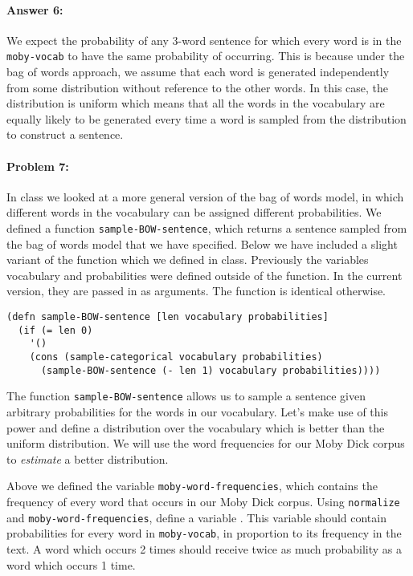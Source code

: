 \documentclass[10pt]{article}
\newcommand{\required}[1]{{\color{blue}{#1}}}
\begin{document}
\paragraph{Answer 6:} We expect the probability of any 3-word sentence for which every word is in the \verb|moby-vocab| to have the same probability of occurring. This is because under the bag of words approach, we assume that each word is generated independently from some distribution without reference to the other words. In this case, the distribution is uniform which means that all the words in the vocabulary are equally likely to be generated every time a word is sampled from the distribution to construct a sentence.

\noindent\hrulefill %

\paragraph{Problem 7:}

In class we looked at a more general version of the bag of words
model, in which different words in the vocabulary can be assigned
different probabilities. We defined a function \texttt{sample-BOW-sentence},
which returns a sentence sampled from the bag of words model that we
have specified. Below we have included a slight variant of the
function which we defined in class. Previously the variables
vocabulary and probabilities were defined outside of the function. In
the current version, they are passed in as arguments. The function is
identical otherwise.

\begin{lstlisting}
(defn sample-BOW-sentence [len vocabulary probabilities]
  (if (= len 0)
    '()
    (cons (sample-categorical vocabulary probabilities)
	  (sample-BOW-sentence (- len 1) vocabulary probabilities))))
\end{lstlisting}

The function \texttt{sample-BOW-sentence} allows us to sample a
sentence given arbitrary probabilities for the words in our
vocabulary. Let's make use of this power and define a distribution
over the vocabulary which is better than the uniform distribution. We
will use the word frequencies for our Moby Dick corpus to
\emph{estimate} a better distribution.
  
Above we defined the variable \texttt{moby-word-frequencies}, which
contains the frequency of every word that occurs in our Moby Dick
corpus. Using \texttt{normalize} and \texttt{moby-word-frequencies},
define a variable \required{\texttt{moby-word-probabilities}}. This variable
should contain probabilities for every word in \texttt{moby-vocab}, in
proportion to its frequency in the text. A word which occurs 2 times
should receive twice as much probability as a word which occurs 1
time.
\end{document}

